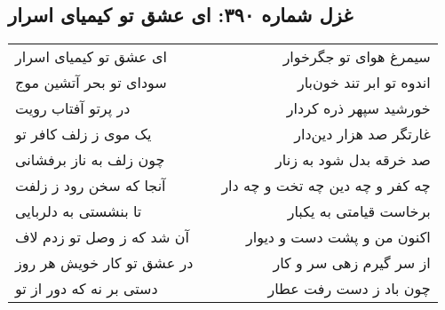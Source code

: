 \begin{center}
\section*{غزل شماره ۳۹۰: ای عشق تو کیمیای اسرار}
\label{sec:390}
\begin{longtable}{l p{0.5cm} r}
ای عشق تو کیمیای اسرار
&&
سیمرغ هوای تو جگرخوار
\\
سودای تو بحر آتشین موج
&&
اندوه تو ابر تند خون‌بار
\\
در پرتو آفتاب رویت
&&
خورشید سپهر ذره کردار
\\
یک موی ز زلف کافر تو
&&
غارتگر صد هزار دین‌دار
\\
چون زلف به ناز برفشانی
&&
صد خرقه بدل شود به زنار
\\
آنجا که سخن رود ز زلفت
&&
چه کفر و چه دین چه تخت و چه دار
\\
تا بنشستی به دلربایی
&&
برخاست قیامتی به یکبار
\\
آن شد که ز وصل تو زدم لاف
&&
اکنون من و پشت دست و دیوار
\\
در عشق تو کار خویش هر روز
&&
از سر گیرم زهی سر و کار
\\
دستی بر نه که دور از تو
&&
چون باد ز دست رفت عطار
\\
\end{longtable}
\end{center}
